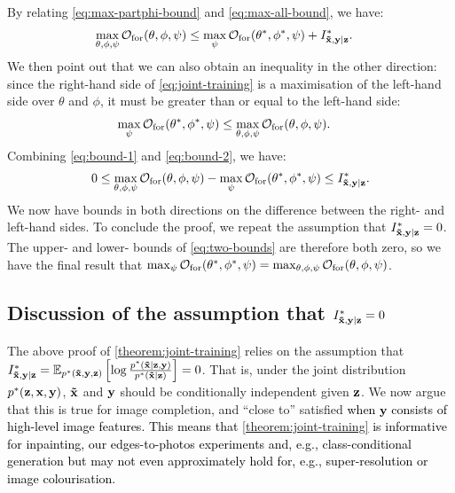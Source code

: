 By relating \cref{eq:max-partphi-bound} and \cref{eq:max-all-bound}, we have:
\begin{align}
  \max_{\theta, \phi, \psi{}} \mathcal{O}_\mathrm{for}(\theta, \phi, \psi{}) &\leq  \max_{\psi{}} \mathcal{O}_\mathrm{for}({\theta}^*, {\phi}^*, \psi{}) + I^*_{\mathbf{\tilde{x}}{},\mathbf{y}{}|\mathbf{z}{}}{}. \label{eq:bound-1}
\end{align}
We then point out that we can also obtain an inequality in the other direction: since
the right-hand side of \cref{eq:joint-training} is a maximisation of the left-hand side over $\theta$ and
$\phi$, it must be greater than or equal to the left-hand side:
\begin{align}
  \max_{\psi{}} \mathcal{O}_\mathrm{for}({\theta}^*, {\phi}^*, \psi{}) &\leq  \max_{\theta, \phi, \psi{}} \mathcal{O}_\mathrm{for}(\theta, \phi, \psi{})  . \label{eq:bound-2}
\end{align}
Combining \cref{eq:bound-1} and \cref{eq:bound-2}, we have:
\begin{align}
  0 \leq \max_{\theta, \phi, \psi{}} \mathcal{O}_\mathrm{for}(\theta, \phi, \psi{}) - \max_{\psi{}} \mathcal{O}_\mathrm{for}({\theta}^*, {\phi}^*, \psi{}) \leq I^*_{\mathbf{\tilde{x}}{},\mathbf{y}{}|\mathbf{z}{}}{}. \label{eq:two-bounds}
\end{align}
We now have bounds in both directions on the difference between the right- and
left-hand sides. To conclude the proof, we repeat the assumption that
$I^*_{\mathbf{\tilde{x}}{},\mathbf{y}{}|\mathbf{z}{}}{}=0$. The upper- and lower- bounds of \cref{eq:two-bounds} are
therefore both zero, so we have the final result that ${\max_{\psi{}}
\mathcal{O}_\mathrm{for}({\theta}^*, {\phi}^*, \psi{}) =
\max_{\theta, \phi, \psi{}} \mathcal{O}_\mathrm{for}(\theta, \phi,
\psi{})}$.

\subsection{Discussion of the assumption that $I^*_{\mathbf{\tilde{x}}{},\mathbf{y}{}|\mathbf{z}{}}{}=0$}
The above proof of \cref{theorem:joint-training} relies on the assumption that
$I^*_{\mathbf{\tilde{x}}{},\mathbf{y}{}|\mathbf{z}{}}{} = \mathbb{E}_{{p}^*{}(\mathbf{\tilde{x}}{}, \mathbf{y}{}, \mathbf{z}{})} \left[ \log
  \frac{{p}^*{}(\mathbf{\tilde{x}}{}|\mathbf{z}{}, \mathbf{y}{}) }{ {p}^*{}(\mathbf{\tilde{x}}{}|\mathbf{z}{}) } \right] = 0$.
That is, under the joint distribution $p^*(\mathbf{z}{},\mathbf{x}{},\mathbf{y}{})$, $\mathbf{\tilde{x}}{}$ and
$\mathbf{y}{}$ should be conditionally independent given $\mathbf{z}{}$. We now argue that this
is true for image completion, and ``close to'' satisfied \textcolor{black}{when
  $\mathbf{y}$ consists of high-level image features. This means that
  \cref{theorem:joint-training} is informative for inpainting, our
  edges-to-photos experiments and, e.g., class-conditional generation but may
  not even approximately hold for, e.g., super-resolution or image
  colourisation.}

